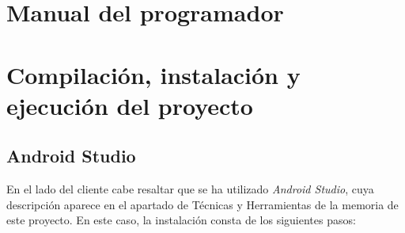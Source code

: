 \section{Manual del programador}

\section{Compilación, instalación y ejecución del proyecto}

\subsection{Android Studio}
En el lado del cliente cabe resaltar que se ha utilizado \textit{Android
Studio}, cuya descripción aparece en el apartado de Técnicas y Herramientas de
la memoria de este proyecto. En este caso, la instalación consta de los
siguientes pasos:

